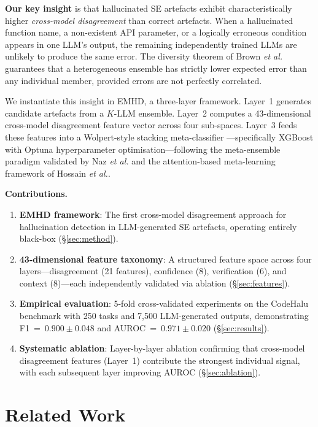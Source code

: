 \documentclass{svproc}
\newcommand{\method}{\textsc{EMHD}}
\newcommand{\etal}{\textit{et al.}}
\begin{document}
\textbf{Our key insight} is that hallucinated SE artefacts exhibit characteristically higher \emph{cross-model disagreement} than correct artefacts. When a hallucinated function name, a non-existent API parameter, or a logically erroneous condition appears in one LLM's output, the remaining independently trained LLMs are unlikely to produce the same error. The diversity theorem of Brown \etal \cite{brown2005diversity} guarantees that a heterogeneous ensemble has strictly lower expected error than any individual member, provided errors are not perfectly correlated.

We instantiate this insight in \method{}, a three-layer framework. Layer~1 generates candidate artefacts from a $K$-LLM ensemble. Layer~2 computes a 43-dimensional cross-model disagreement feature vector across four sub-spaces. Layer~3 feeds these features into a Wolpert-style stacking meta-classifier \cite{wolpert1992stacking}---specifically XGBoost \cite{chen2016xgboost} with Optuna hyperparameter optimisation---following the meta-ensemble paradigm validated by Naz \etal \cite{naz2025metaensemble} and the attention-based meta-learning framework of Hossain \etal \cite{hossain2025attention}.

\medskip
\noindent\textbf{Contributions.}
\begin{enumerate}
\item \textbf{EMHD framework}: The first cross-model disagreement approach for hallucination detection in LLM-generated SE artefacts, operating entirely black-box (\S\ref{sec:method}).
\item \textbf{43-dimensional feature taxonomy}: A structured feature space across four layers---disagreement (21 features), confidence (8), verification (6), and context (8)---each independently validated via ablation (\S\ref{sec:features}).
\item \textbf{Empirical evaluation}: 5-fold cross-validated experiments on the CodeHalu benchmark \cite{tian2025codehalu} with 250 tasks and 7,500 LLM-generated outputs, demonstrating F1~=~$0.900 \pm 0.048$ and AUROC~=~$0.971 \pm 0.020$ (\S\ref{sec:results}).
\item \textbf{Systematic ablation}: Layer-by-layer ablation confirming that cross-model disagreement features (Layer~1) contribute the strongest individual signal, with each subsequent layer improving AUROC (\S\ref{sec:ablation}).
\end{enumerate}

\section{Related Work}\label{sec:related}
\end{document}
